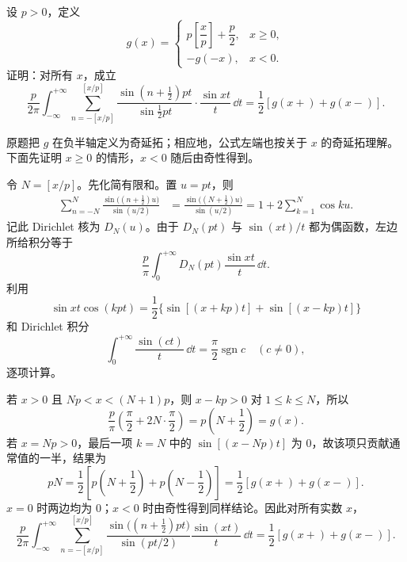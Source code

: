 \begin{xreferenceproblem}[10]
设 $p>0$，定义
  \[
    g(x)=
    \begin{cases}
      p\left[\dfrac xp\right]+\dfrac p2, & x\geq0,\\
      -g(-x), & x<0.
    \end{cases}
  \]
  证明：对所有 $x$，成立
  \[
    \frac{p}{2\pi}\int_{-\infty}^{+\infty}
    \sum_{n=-[x/p]}^{[x/p]}
    \frac{\sin\left(n+\frac12\right)pt}{\sin\frac12pt}\cdot\frac{\sin xt}{t}\,\dd t
    =\frac12[g(x+)+g(x-)].
  \]
\end{xreferenceproblem}
\begin{xsolution}
原题把 $g$ 在负半轴定义为奇延拓；相应地，公式左端也按关于 $x$ 的奇延拓理解。下面先证明 $x\geq0$ 的情形，$x<0$ 随后由奇性得到。

令 $N=[x/p]$。先化简有限和。置 $u=pt$，则
\begin{align*}
  \sum_{n=-N}^{N}\frac{\sin\bigl((n+\frac12)u\bigr)}{\sin(u/2)}
  &=\frac{\sin\bigl((N+\frac12)u\bigr)}{\sin(u/2)}
  =1+2\sum_{k=1}^{N}\cos ku.
\end{align*}
记此 Dirichlet 核为 $D_N(u)$。由于 $D_N(pt)$ 与 $\sin(xt)/t$ 都为偶函数，左边所给积分等于
\[
  \frac p\pi\int_0^{+\infty}D_N(pt)\frac{\sin xt}{t}\,\dd t.
\]
利用
\[
  \sin xt\cos(kpt)
  =\frac12\{\sin[(x+kp)t]+\sin[(x-kp)t]\}
\]
和 Dirichlet 积分
\[
  \int_0^{+\infty}\frac{\sin(ct)}t\,\dd t
  =\frac\pi2\operatorname{sgn}c
  \quad(c\ne0),
\]
逐项计算。

若 $x>0$ 且 $Np<x<(N+1)p$，则 $x-kp>0$ 对 $1\leq k\leq N$，所以
\[
  \frac p\pi\left(\frac\pi2+2N\cdot\frac\pi2\right)
  =p\left(N+\frac12\right)=g(x).
\]
若 $x=Np>0$，最后一项 $k=N$ 中的 $\sin[(x-Np)t]$ 为 $0$，故该项只贡献通常值的一半，结果为
\[
  pN=\frac12\left[p\left(N+\frac12\right)+p\left(N-\frac12\right)\right]
  =\frac12[g(x+)+g(x-)].
\]
$x=0$ 时两边均为 $0$；$x<0$ 时由奇性得到同样结论。因此对所有实数 $x$，
\[
  \boxed{
  \frac{p}{2\pi}\int_{-\infty}^{+\infty}
  \sum_{n=-[x/p]}^{[x/p]}
  \frac{\sin\bigl((n+\frac12)pt\bigr)}{\sin(pt/2)}\frac{\sin(xt)}{t}\,\dd t
  =\frac12[g(x+)+g(x-)].}
\]
\end{xsolution}

